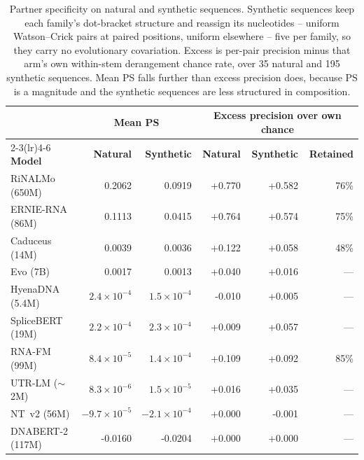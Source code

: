 \begin{table}[htbp]
\centering
\caption{Partner specificity on natural and synthetic sequences. Synthetic sequences keep each family's dot-bracket structure and reassign its nucleotides -- uniform Watson--Crick pairs at paired positions, uniform elsewhere -- five per family, so they carry no evolutionary covariation. Excess is per-pair precision minus that arm's own within-stem derangement chance rate, over 35 natural and 195 synthetic sequences. Mean PS falls further than excess precision does, because PS is a magnitude and the synthetic sequences are less structured in composition.}
\label{tab:synthetic}
\small
\begin{tabular}{@{}lrrrrr@{}}
\toprule
 & \multicolumn{2}{c}{\textbf{Mean PS}} & \multicolumn{3}{c}{\textbf{Excess precision over own chance}} \\
\cmidrule(lr){2-3}\cmidrule(lr){4-6}
\textbf{Model} & \textbf{Natural} & \textbf{Synthetic} & \textbf{Natural} & \textbf{Synthetic} & \textbf{Retained} \\
\midrule
RiNALMo (650M) & 0.2062 & 0.0919 & +0.770 & +0.582 & 76\% \\
ERNIE-RNA (86M) & 0.1113 & 0.0415 & +0.764 & +0.574 & 75\% \\
Caduceus (14M) & 0.0039 & 0.0036 & +0.122 & +0.058 & 48\% \\
Evo (7B) & 0.0017 & 0.0013 & +0.040 & +0.016 & --- \\
HyenaDNA (5.4M) & $2.4 \times 10^{-4}$ & $1.5 \times 10^{-4}$ & -0.010 & +0.005 & --- \\
SpliceBERT (19M) & $2.2 \times 10^{-4}$ & $2.3 \times 10^{-4}$ & +0.009 & +0.057 & --- \\
RNA-FM (99M) & $8.4 \times 10^{-5}$ & $1.4 \times 10^{-4}$ & +0.109 & +0.092 & 85\% \\
UTR-LM ($\sim$2M) & $8.3 \times 10^{-6}$ & $1.5 \times 10^{-5}$ & +0.016 & +0.035 & --- \\
NT~v2 (56M) & $-9.7 \times 10^{-5}$ & $-2.1 \times 10^{-4}$ & +0.000 & -0.001 & --- \\
DNABERT-2 (117M) & -0.0160 & -0.0204 & +0.000 & +0.000 & --- \\
\bottomrule
\end{tabular}
\end{table}
